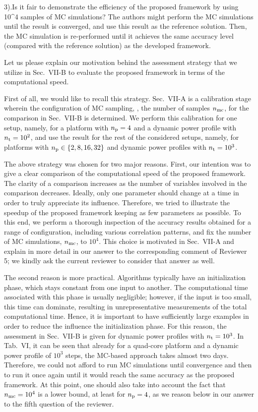\begin{reviewer}
3).Is it fair to demonstrate the efficiency of the proposed framework by using 10\^{}4 samples of MC simulations? The authors might perform the MC simulations until the result is converged, and use this result as the reference solution. Then, the MC simulation is re-performed until it achieves the same accuracy level (compared with the reference solution) as the developed framework.
\end{reviewer}
\begin{authors}
Let us please explain our motivation behind the assessment strategy that we utilize in Sec.~VII-B to evaluate the proposed framework in terms of the computational speed.

First of all, we would like to recall this strategy.
Sec.~VII-A is a calibration stage wherein the configuration of MC sampling, \ie, the number of samples ${n_\text{mc}}$, for the comparison in Sec.~VII-B is determined.
We perform this calibration for one setup, namely, for a platform with ${n_\text{p}} = 4$ and a dynamic power profile with ${n_\text{t}} = 10^2$, and use the result for the rest of the considered setups, namely, for platforms with ${n_\text{p}} \in \{ 2, 8, 16, 32 \}$ and dynamic power profiles with ${n_\text{t}} = 10^3$.

The above strategy was chosen for two major reasons.
First, our intention was to give a clear comparison of the computational speed of the proposed framework.
The clarity of a comparison increases as the number of variables involved in the comparison decreases.
Ideally, only one parameter should change at a time in order to truly appreciate its influence.
Therefore, we tried to illustrate the speedup of the proposed framework keeping as few parameters as possible.
To this end, we perform a thorough inspection of the accuracy results obtained for a range of configuration, including various correlation patterns, and fix the number of MC simulations, ${n_\text{mc}}$, to $10^4$.
This choice is motivated in Sec.~VII-A and explain in more detail in our answer to the corresponding comment of Reviewer 5; we kindly ask the current reviewer to consider that answer as well.

The second reason is more practical.
Algorithms typically have an initialization phase, which stays constant from one input to another.
The computational time associated with this phase is usually negligible; however, if the input is too small, this time can dominate, resulting in unrepresentative measurements of the total computational time.
Hence, it is important to have sufficiently large examples in order to reduce the influence the initialization phase.
For this reason, the assessment in Sec.~VII-B is given for dynamic power profiles with ${n_\text{t}} = 10^3$.
In Tab.~VI, it can be seen that already for a quad-core platform and a dynamic power profile of $10^3$ steps, the MC-based approach takes almost two days.
Therefore, we could not afford to run MC simulations until convergence and then to run it once again until it would reach the same accuracy as the proposed framework.
At this point, one should also take into account the fact that ${n_\text{mc}} = 10^4$ is a lower bound, at least for ${n_\text{p}} = 4$, as we reason below in our answer to the fifth question of the reviewer.


\end{authors}
